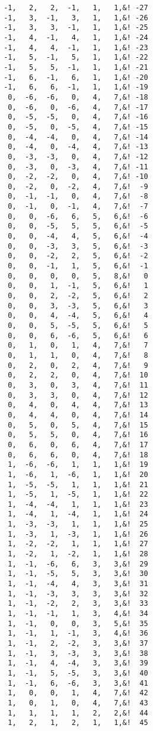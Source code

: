 \begin{Verbatim}
 -1,   2,   2,  -1,   1,   1,&! -27
 -1,   3,  -1,   3,   1,   1,&! -26
 -1,   3,   3,  -1,   1,   1,&! -25
 -1,   4,  -1,   4,   1,   1,&! -24
 -1,   4,   4,  -1,   1,   1,&! -23
 -1,   5,  -1,   5,   1,   1,&! -22
 -1,   5,   5,  -1,   1,   1,&! -21
 -1,   6,  -1,   6,   1,   1,&! -20
 -1,   6,   6,  -1,   1,   1,&! -19
  0,  -6,  -6,   0,   4,   7,&! -18
  0,  -6,   0,  -6,   4,   7,&! -17
  0,  -5,  -5,   0,   4,   7,&! -16
  0,  -5,   0,  -5,   4,   7,&! -15
  0,  -4,  -4,   0,   4,   7,&! -14
  0,  -4,   0,  -4,   4,   7,&! -13
  0,  -3,  -3,   0,   4,   7,&! -12
  0,  -3,   0,  -3,   4,   7,&! -11
  0,  -2,  -2,   0,   4,   7,&! -10
  0,  -2,   0,  -2,   4,   7,&!  -9
  0,  -1,  -1,   0,   4,   7,&!  -8
  0,  -1,   0,  -1,   4,   7,&!  -7
  0,   0,  -6,   6,   5,   6,&!  -6
  0,   0,  -5,   5,   5,   6,&!  -5
  0,   0,  -4,   4,   5,   6,&!  -4
  0,   0,  -3,   3,   5,   6,&!  -3
  0,   0,  -2,   2,   5,   6,&!  -2
  0,   0,  -1,   1,   5,   6,&!  -1
  0,   0,   0,   0,   5,   8,&!   0
  0,   0,   1,  -1,   5,   6,&!   1
  0,   0,   2,  -2,   5,   6,&!   2
  0,   0,   3,  -3,   5,   6,&!   3
  0,   0,   4,  -4,   5,   6,&!   4
  0,   0,   5,  -5,   5,   6,&!   5
  0,   0,   6,  -6,   5,   6,&!   6
  0,   1,   0,   1,   4,   7,&!   7
  0,   1,   1,   0,   4,   7,&!   8
  0,   2,   0,   2,   4,   7,&!   9
  0,   2,   2,   0,   4,   7,&!  10
  0,   3,   0,   3,   4,   7,&!  11
  0,   3,   3,   0,   4,   7,&!  12
  0,   4,   0,   4,   4,   7,&!  13
  0,   4,   4,   0,   4,   7,&!  14
  0,   5,   0,   5,   4,   7,&!  15
  0,   5,   5,   0,   4,   7,&!  16
  0,   6,   0,   6,   4,   7,&!  17
  0,   6,   6,   0,   4,   7,&!  18
  1,  -6,  -6,   1,   1,   1,&!  19
  1,  -6,   1,  -6,   1,   1,&!  20
  1,  -5,  -5,   1,   1,   1,&!  21
  1,  -5,   1,  -5,   1,   1,&!  22
  1,  -4,  -4,   1,   1,   1,&!  23
  1,  -4,   1,  -4,   1,   1,&!  24
  1,  -3,  -3,   1,   1,   1,&!  25
  1,  -3,   1,  -3,   1,   1,&!  26
  1,  -2,  -2,   1,   1,   1,&!  27
  1,  -2,   1,  -2,   1,   1,&!  28
  1,  -1,  -6,   6,   3,   3,&!  29
  1,  -1,  -5,   5,   3,   3,&!  30
  1,  -1,  -4,   4,   3,   3,&!  31
  1,  -1,  -3,   3,   3,   3,&!  32
  1,  -1,  -2,   2,   3,   3,&!  33
  1,  -1,  -1,   1,   3,   4,&!  34
  1,  -1,   0,   0,   3,   5,&!  35
  1,  -1,   1,  -1,   3,   4,&!  36
  1,  -1,   2,  -2,   3,   3,&!  37
  1,  -1,   3,  -3,   3,   3,&!  38
  1,  -1,   4,  -4,   3,   3,&!  39
  1,  -1,   5,  -5,   3,   3,&!  40
  1,  -1,   6,  -6,   3,   3,&!  41
  1,   0,   0,   1,   4,   7,&!  42
  1,   0,   1,   0,   4,   7,&!  43
  1,   1,   1,   1,   2,   2,&!  44
  1,   2,   1,   2,   1,   1,&!  45

\end{Verbatim}
